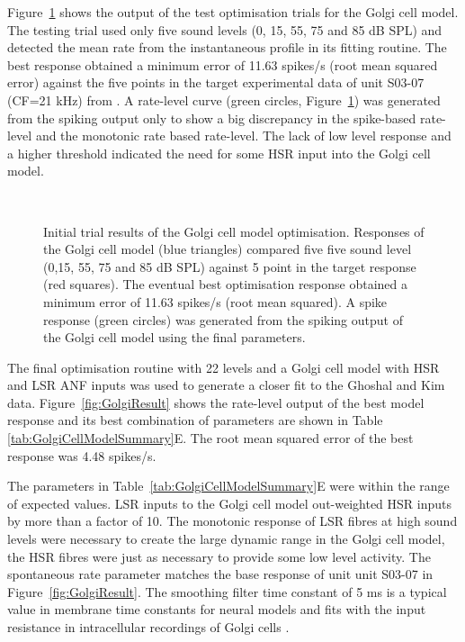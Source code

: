  Figure~\ref{fig:GolgiTestResult} shows the output of the test
 optimisation trials for the Golgi cell model.  The testing trial used
 only five sound levels (0, 15, 55, 75 and 85 dB SPL) and detected the
 mean rate from the instantaneous profile in its fitting routine. The
 best response obtained a minimum error of 11.63 spikes/s (root mean
 squared error) against the five points in the target experimental
 data of unit S03-07 (CF=21 kHz) from \citep{GhoshalKim:1996}. A
 rate-level curve (green circles, Figure~\ref{fig:GolgiTestResult})
 was generated from the spiking output only to show a big discrepancy
 in the spike-based rate-level and the monotonic rate based
 rate-level. The lack of low level response and a higher threshold
 indicated the need for some HSR input into the Golgi cell model.

\smallskip{}


\begin{figure}[htb]
  \centering
  \\
  \caption{Initial trial results of the Golgi cell model optimisation.
    Responses of the Golgi cell model (blue triangles) compared five five sound
    level (0,15, 55, 75 and 85 dB SPL) against 5 point in the target response
    (red squares). The eventual best optimisation response obtained a minimum
    error of 11.63 spikes/s (root mean squared). A spike response (green
    circles) was generated from the spiking output of the Golgi cell model using
    the final parameters.  }\label{fig:GolgiTestResult}
\end{figure}

The final optimisation routine with 22 levels and a Golgi cell model with HSR
and LSR ANF inputs was used to generate a closer fit to the Ghoshal and Kim
data. Figure~\ref{fig:GolgiResult} shows the rate-level output of the best model
response and its best combination of parameters are shown in Table
\ref{tab:GolgiCellModelSummary}E. The root mean squared error of the best
response was 4.48 spikes/s.

The parameters in Table~\ref{tab:GolgiCellModelSummary}E were within
the range of expected values. LSR inputs to the Golgi cell model
out-weighted HSR inputs by more than a factor of 10. The monotonic
response of LSR fibres at high sound levels were necessary to create
the large dynamic range in the Golgi cell model, the HSR fibres were
just as necessary to provide some low level activity. The spontaneous
rate parameter matches the base response of unit unit S03-07 in
Figure~\ref{fig:GolgiResult}. The smoothing filter time constant of 5
ms is a typical value in membrane time constants for neural models and
fits with the input resistance in intracellular recordings of Golgi
cells \citep{FerragamoGoldingEtAl:1998}.  

